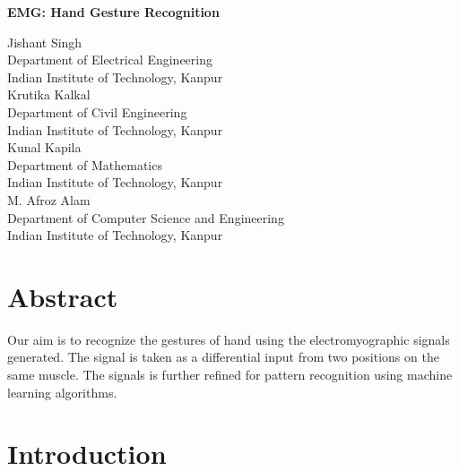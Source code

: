 \documentclass{article}
\begin{document}
\begin{titlepage}
    \begin{center}
        \vspace*{7cm}
        
        {\Huge{\textbf{EMG: Hand Gesture Recognition}}}
        \vspace{1.5cm}
        
        {\large{Jishant Singh\\
Department of Electrical Engineering\\
Indian Institute of Technology, Kanpur\\}
\vspace{0.5cm}
{\large{Krutika Kalkal\\
Department of Civil Engineering\\
Indian Institute of Technology, Kanpur\\}}
\vspace{0.5cm}
{\large{Kunal Kapila\\
Department of Mathematics\\
Indian Institute of Technology, Kanpur\\}}
\vspace{0.5cm}
{\large{M. Afroz Alam\\
Department of Computer Science and Engineering\\
Indian Institute of Technology, Kanpur}}

        \vfill
        }
    \end{center}
\end{titlepage}

\pagebreak
\vspace*{2.5in}
\tableofcontents
\pagebreak
\section{Abstract}
Our aim is to recognize the gestures of hand using the electromyographic signals generated.  The signal is taken as a differential input from two positions on the same muscle. The signals is further refined for pattern recognition using machine learning algorithms.

\section{Introduction}
\end{document}
